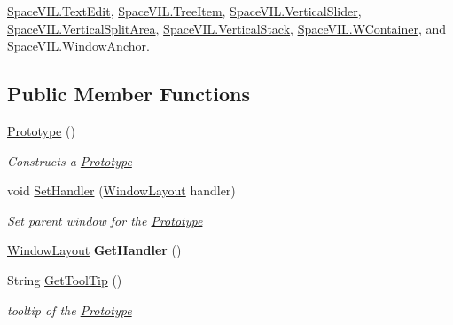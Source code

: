\mbox{\hyperlink{class_space_v_i_l_1_1_text_edit}{Space\+V\+I\+L.\+Text\+Edit}}, \mbox{\hyperlink{class_space_v_i_l_1_1_tree_item}{Space\+V\+I\+L.\+Tree\+Item}}, \mbox{\hyperlink{class_space_v_i_l_1_1_vertical_slider}{Space\+V\+I\+L.\+Vertical\+Slider}}, \mbox{\hyperlink{class_space_v_i_l_1_1_vertical_split_area}{Space\+V\+I\+L.\+Vertical\+Split\+Area}}, \mbox{\hyperlink{class_space_v_i_l_1_1_vertical_stack}{Space\+V\+I\+L.\+Vertical\+Stack}}, \mbox{\hyperlink{class_space_v_i_l_1_1_w_container}{Space\+V\+I\+L.\+W\+Container}}, and \mbox{\hyperlink{class_space_v_i_l_1_1_window_anchor}{Space\+V\+I\+L.\+Window\+Anchor}}.

\subsection*{Public Member Functions}
\begin{DoxyCompactItemize}
\item 
\mbox{\hyperlink{class_space_v_i_l_1_1_prototype_a9205e6953992749881d7de1af9dc492e}{Prototype}} ()
\begin{DoxyCompactList}\small\item\em Constructs a \mbox{\hyperlink{class_space_v_i_l_1_1_prototype}{Prototype}} \end{DoxyCompactList}\item 
void \mbox{\hyperlink{class_space_v_i_l_1_1_prototype_a3f460b82d96e624ae4f2c203774d6c60}{Set\+Handler}} (\mbox{\hyperlink{class_space_v_i_l_1_1_window_layout}{Window\+Layout}} handler)
\begin{DoxyCompactList}\small\item\em Set parent window for the \mbox{\hyperlink{class_space_v_i_l_1_1_prototype}{Prototype}} \end{DoxyCompactList}\item 
\mbox{\label{class_space_v_i_l_1_1_prototype_ab39361662b98d507caebfbbf4bc1ffab}} 
\mbox{\hyperlink{class_space_v_i_l_1_1_window_layout}{Window\+Layout}} {\bfseries Get\+Handler} ()
\item 
String \mbox{\hyperlink{class_space_v_i_l_1_1_prototype_a87c98f228c5c5f11fcf62d7534054fd6}{Get\+Tool\+Tip}} ()
\begin{DoxyCompactList}\small\item\em tooltip of the \mbox{\hyperlink{class_space_v_i_l_1_1_prototype}{Prototype}} \end{DoxyCompactList}\item 
\mbox{\label{class_space_v_i_l_1_1_prototype_a12e395a2d851006b3208548c1020fbfa}} 

\end{DoxyCompactItemize}
